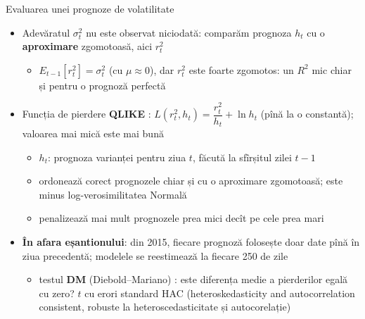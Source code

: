 \begin{frame}{Evaluarea unei prognoze de volatilitate}
\itemsize{\small}
\begin{itemize}
    \item Adevăratul $\sigma_t^2$ nu este observat niciodată: comparăm prognoza $h_t$ cu o \textbf{aproximare} zgomotoasă, aici $r_t^2$
    \begin{itemize}
        \item $E_{t-1}[r_t^2] = \sigma_t^2$ (cu $\mu \approx 0$), dar $r_t^2$ este foarte zgomotos: un $R^2$ mic chiar și pentru o prognoză perfectă 
    \end{itemize}
    \item Funcția de pierdere \textbf{QLIKE} : $L(r_t^2, h_t) = \dfrac{r_t^2}{h_t} + \ln h_t$ (pînă la o constantă); valoarea mai mică este mai bună
    \begin{itemize}
        \item $h_t$: prognoza varianței pentru ziua $t$, făcută la sfîrșitul zilei $t-1$
        \item ordonează corect prognozele chiar și cu o aproximare zgomotoasă; este minus log-verosimilitatea Normală
        \item penalizează mai mult prognozele prea mici decît pe cele prea mari
    \end{itemize}
    \item \textbf{În afara eșantionului}: din 2015, fiecare prognoză folosește doar date pînă în ziua precedentă; modelele se reestimează la fiecare 250 de zile
    \begin{itemize}
        \item testul \textbf{DM} (Diebold--Mariano) : este diferența medie a pierderilor egală cu zero? $t$ cu erori standard HAC (heteroskedasticity and autocorrelation consistent, robuste la heteroscedasticitate și autocorelație)
    \end{itemize}
\end{itemize}
\end{frame}

